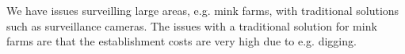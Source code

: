 We have issues surveilling large areas, e.g. mink farms, with traditional solutions such as surveillance cameras.
The issues with a traditional solution for mink farms are that the establishment costs are very high due to e.g. digging.
